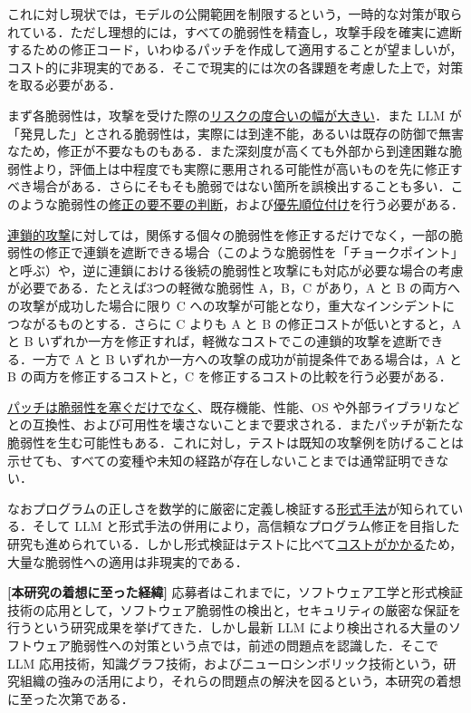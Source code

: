 \documentclass[11pt,a4j,dvipdfmx]{jarticle} 					%
\newcommand{\研究課題名}{大量の脆弱性・攻撃手段・パッチの依存関係を考慮した証明付き修正計画の自動生成}
\newcommand{\研究機関名}{電気通信大学}
\newcommand{\研究代表者氏名}{田原 康之}
\newcommand{\研究期間の最終元号年度}{12}  %
\begin{document}
これに対し現状では，モデルの公開範囲を制限するという，一時的な対策が取られている．ただし理想的には，すべての脆弱性を精査し，攻撃手段を確実に遮断するための修正コード，いわゆるパッチを作成して適用することが望ましいが，コスト的に非現実的である．そこで現実的には次の各課題を考慮した上で，対策を取る必要がある．

まず各脆弱性は，攻撃を受けた際の\ul{リスクの度合いの幅が大きい}．また LLM が「発見した」とされる脆弱性は，実際には到達不能，あるいは既存の防御で無害なため，修正が不要なものもある．また深刻度が高くても外部から到達困難な脆弱性より，評価上は中程度でも実際に悪用される可能性が高いものを先に修正すべき場合がある．さらにそもそも脆弱ではない箇所を誤検出することも多い．このような脆弱性の\ul{修正の要不要の判断}，および\ul{優先順位付け}を行う必要がある．

\ul{連鎖的攻撃}に対しては，関係する個々の脆弱性を修正するだけでなく，一部の脆弱性の修正で連鎖を遮断できる場合（このような脆弱性を「チョークポイント」と呼ぶ）や，逆に連鎖における後続の脆弱性と攻撃にも対応が必要な場合の考慮が必要である．たとえば3つの軽微な脆弱性 A，B，C があり，A と B の両方への攻撃が成功した場合に限り C への攻撃が可能となり，重大なインシデントにつながるものとする．さらに C よりも A と B の修正コストが低いとすると，A と B いずれか一方を修正すれば，軽微なコストでこの連鎖的攻撃を遮断できる．一方で A と B いずれか一方への攻撃の成功が前提条件である場合は，A と B の両方を修正するコストと，C を修正するコストの比較を行う必要がある．

\ul{パッチは脆弱性を塞ぐだけでなく}、既存機能、性能、OS や外部ライブラリなどとの互換性、および可用性を壊さないことまで要求される．またパッチが新たな脆弱性を生む可能性もある．これに対し，テストは既知の攻撃例を防げることは示せても、すべての変種や未知の経路が存在しないことまでは通常証明できない．

  なおプログラムの正しさを数学的に厳密に定義し検証する\ul{形式手法}が知られている．そして LLM と形式手法の併用により，高信頼なプログラム修正を目指した研究も進められている．しかし形式検証はテストに比べて\ul{コストがかかる}ため，大量な脆弱性への適用は非現実的である．

\textbf{[本研究の着想に至った経緯]} 応募者はこれまでに，ソフトウェア工学と形式検証技術の応用として，ソフトウェア脆弱性の検出と，セキュリティの厳密な保証を行うという研究成果を挙げてきた．しかし最新 LLM により検出される大量のソフトウェア脆弱性への対策という点では，前述の問題点を認識した．そこで LLM 応用技術，知識グラフ技術，およびニューロシンボリック技術という，研究組織の強みの活用により，それらの問題点の解決を図るという，本研究の着想に至った次第である．
\end{document}
